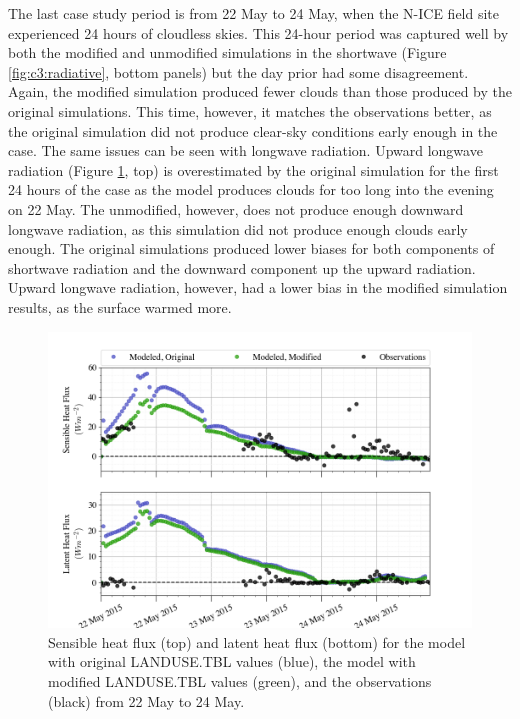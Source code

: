The last case study period is from 22 May to 24 May, when the N-ICE field site experienced 24 hours of cloudless skies. This 24-hour period was captured well by both the modified and unmodified simulations in the shortwave (Figure \ref{fig:c3:radiative}, bottom panels) but the day prior had some disagreement. Again, the modified simulation produced fewer clouds than those produced by the original simulations. This time, however, it matches the observations better, as the original simulation did not produce clear-sky conditions early enough in the case. The same issues can be seen with longwave radiation. Upward longwave radiation (Figure \ref{fig:c3:heat}, top) is overestimated by the original simulation for the first 24 hours of the case as the model produces clouds for too long into the evening on 22 May. The unmodified, however, does not produce enough downward longwave radiation, as this simulation did not produce enough clouds early enough. The original simulations produced lower biases for both components of shortwave radiation and the downward component up the upward radiation. Upward longwave radiation, however, had a lower bias in the modified simulation results, as the surface warmed more. 

\begin{figure}[H]
    \centering
    \includegraphics[width=1\linewidth]{figures/chapter6/case3_sensible_latent.png}
    \caption[Idealized Case 3 - Latent and sensible heat fluxes]{Sensible heat flux (top) and latent heat flux (bottom) for the model with original LANDUSE.TBL values (blue), the model with modified LANDUSE.TBL values (green), and the observations (black) from 22 May to 24 May.}
    \label{fig:c3:heat}
\end{figure}

